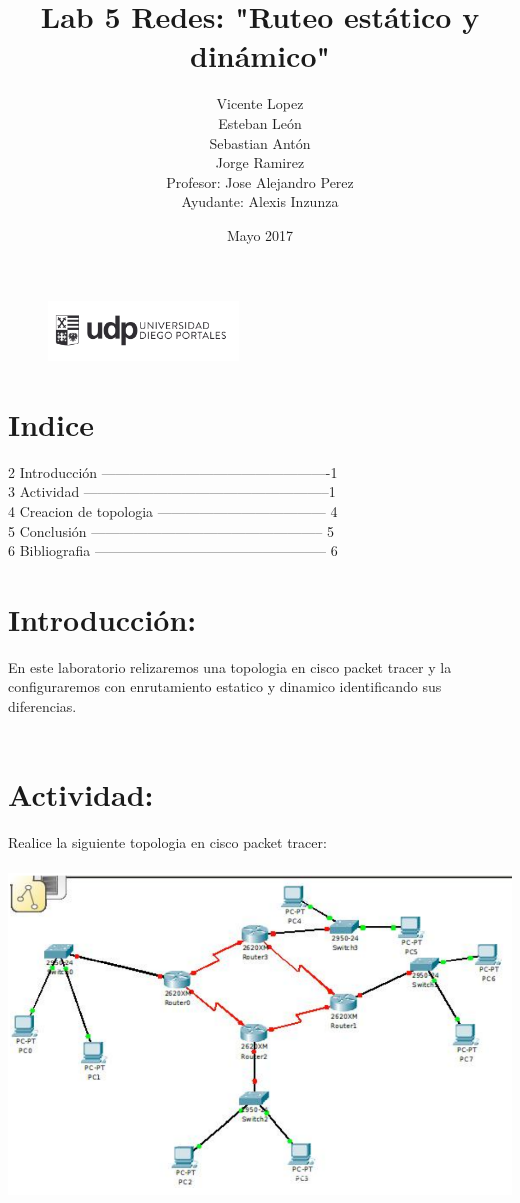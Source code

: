 \documentclass{article}
\title{Lab 5 Redes: "Ruteo estático y dinámico"}
\author{Vicente Lopez\\Esteban León\\Sebastian Antón\\Jorge Ramirez\\Profesor: Jose Alejandro Perez\\Ayudante: Alexis Inzunza}
\date{Mayo 2017}
\begin{document}
\begin{figure}[h]
\includegraphics[width=0.45\textwidth]{logo_udp.png}
\maketitle
\end{figure}

\section{Indice}
2 Introducción -------------------------------------------------1\\
3 Actividad -----------------------------------------------------1\\
4 Creacion de topologia ------------------------------------ 4\\
5 Conclusión -------------------------------------------------- 5\\
6 Bibliografia -------------------------------------------------- 6\\

\section{Introducción:}
En este laboratorio relizaremos una topologia en cisco packet tracer y la configuraremos con enrutamiento estatico y dinamico identificando sus diferencias.\\\\

\section{Actividad:}
Realice la siguiente topologia en cisco packet tracer:\\\\

\includegraphics[scale=0.5]{top.png}\\\\
\end{document}
